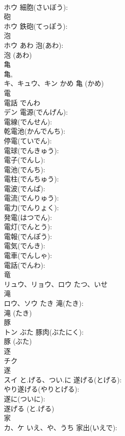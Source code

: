 \documentclass[8pt]{extreport}
\begin{document}
\begin{CJK}{UTF8}{min}
\\	ホウ		細胞(さいぼう): 
\\	砲		
\\	ホウ		鉄砲(てっぽう): 
\\	泡		
\\	ホウ	あわ	泡(あわ): 
\\	泡 (あわ)
\\	亀		
\\	⻲, 
\\	キ、キュウ、キン	かめ		亀 (かめ)
\\	電		
\\	電話 でんわ 
\\	デン		電源(でんげん): 
\\	電線(でんせん): 
\\	乾電池(かんでんち): 
\\	停電(ていでん): 
\\	電球(でんきゅう): 
\\	電子(でんし): 
\\	電池(でんち): 
\\	電柱(でんちゅう): 
\\	電波(でんぱ): 
\\	電流(でんりゅう): 
\\	電力(でんりょく): 
\\	発電(はつでん): 
\\	電灯(でんとう): 
\\	電報(でんぽう): 
\\	電気(でんき): 
\\	電車(でんしゃ): 
\\	電話(でんわ): 
\\	竜		
\\	リュウ、リョウ、ロウ	たつ、いせ		
\\	滝		
\\	ロウ、ソウ	たき	滝(たき): 
\\	滝 (たき)
\\	豚		
\\	トン	ぶた	豚肉(ぶたにく): 
\\	豚 (ぶた)
\\	逐		
\\	チク			
\\	遂		
\\	スイ	と.げる、つい.に	遂げる(とげる): 
\\	やり遂げる(やりとげる): 
\\	遂に(ついに): 
\\	遂げる (と.げる)
\\	家		
\\	カ、ケ	いえ、や、うち	家出(いえで): 

\end{CJK}
\end{document}
